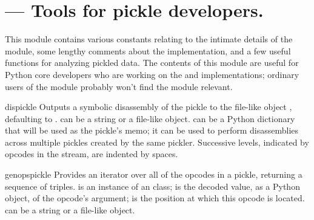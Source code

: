 \section{ --- Tools for pickle developers.}


This module contains various constants relating to the intimate
details of the  module, some lengthy comments about
the implementation, and a few useful functions for analyzing pickled
data.  The contents of this module are useful for Python core
developers who are working on the  and 
implementations; ordinary users of the  module probably
won't find the  module relevant.

\begin{funcdesc}{dis}{pickle}
Outputs a symbolic disassembly of the pickle to the file-like object
, defaulting to .   can be a
string or a file-like object.   can be a Python dictionary
that will be used as the pickle's memo; it can be used to perform
disassemblies across multiple pickles created by the same pickler.
Successive levels, indicated by  opcodes in the stream, are
indented by  spaces.
\end{funcdesc}

\begin{funcdesc}{genops}{pickle}
Provides an iterator over all of the opcodes in a pickle, returning a
sequence of  triples.
 is an instance of an  class;  
is the decoded value, as a Python object, of the opcode's argument; 
 is the position at which this opcode is located.
 can be a string or a file-like object.
\end{funcdesc}

